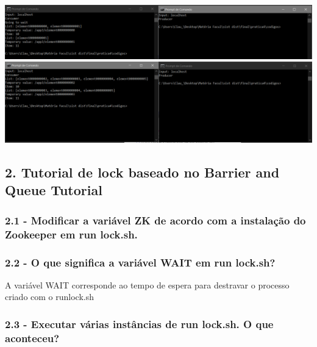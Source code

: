 \includegraphics[width=20cm]{pratica4/prints/roteiro 1.7 c-p.PNG}
\includegraphics[width=20cm]{pratica4/prints/roteiro 1.7 p-p-c.PNG}

\subsection*{2. Tutorial de lock baseado no Barrier and Queue Tutorial}

\subsubsection{2.1 - Modificar a variável ZK de acordo com a instalação do Zookeeper em run lock.sh.}

\vspace{-0.5em}
\begin{minipage}{\textwidth}
  \hspace{-1em}
  \centering
  
  \label{prog1}
  \hspace{1em}
\end{minipage}
\vspace{0.5em}

\subsubsection{2.2 - O que significa a variável WAIT em run lock.sh?}

A variável WAIT corresponde ao tempo de espera para destravar o processo criado com o runlock.sh

\subsubsection{2.3 - Executar várias instâncias de run lock.sh. O que aconteceu?}

